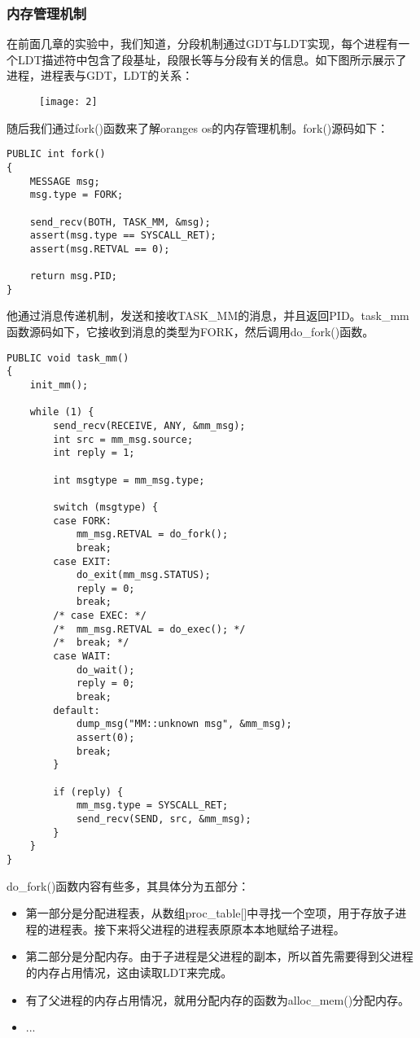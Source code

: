 \documentclass{whureport}
\begin{document}
\subsubsection{内存管理机制}
在前面几章的实验中，我们知道，分段机制通过GDT与LDT实现，每个进程有一个LDT描述符中包含了段基址，段限长等与分段有关的信息。如下图所示展示了进程，进程表与GDT，LDT的关系：

\begin{figure}[H]
\centering
\texttt{[image: 2]}
\end{figure}


随后我们通过fork()函数来了解oranges os的内存管理机制。fork()源码如下：
\begin{lstlisting}
PUBLIC int fork()
{
	MESSAGE msg;
	msg.type = FORK;

	send_recv(BOTH, TASK_MM, &msg);
	assert(msg.type == SYSCALL_RET);
	assert(msg.RETVAL == 0);

	return msg.PID;
}
\end{lstlisting}

他通过消息传递机制，发送和接收TASK\_MM的消息，并且返回PID。task\_mm函数源码如下，它接收到消息的类型为FORK，然后调用do\_fork()函数。

\begin{lstlisting}
PUBLIC void task_mm()
{
	init_mm();

	while (1) {
		send_recv(RECEIVE, ANY, &mm_msg);
		int src = mm_msg.source;
		int reply = 1;

		int msgtype = mm_msg.type;

		switch (msgtype) {
		case FORK:
			mm_msg.RETVAL = do_fork();
			break;
		case EXIT:
			do_exit(mm_msg.STATUS);
			reply = 0;
			break;
		/* case EXEC: */
		/* 	mm_msg.RETVAL = do_exec(); */
		/* 	break; */
		case WAIT:
			do_wait();
			reply = 0;
			break;
		default:
			dump_msg("MM::unknown msg", &mm_msg);
			assert(0);
			break;
		}

		if (reply) {
			mm_msg.type = SYSCALL_RET;
			send_recv(SEND, src, &mm_msg);
		}
	}
}
\end{lstlisting}


do\_fork()函数内容有些多，其具体分为五部分：
\begin{itemize}
  \item 第一部分是分配进程表，从数组proc\_table[]中寻找一个空项，用于存放子进程的进程表。接下来将父进程的进程表原原本本地赋给子进程。
  \item 第二部分是分配内存。由于子进程是父进程的副本，所以首先需要得到父进程的内存占用情况，这由读取LDT来完成。
  \item 有了父进程的内存占用情况，就用分配内存的函数为alloc\_mem()分配内存。
  \item ...
\end{itemize}
\end{document}
